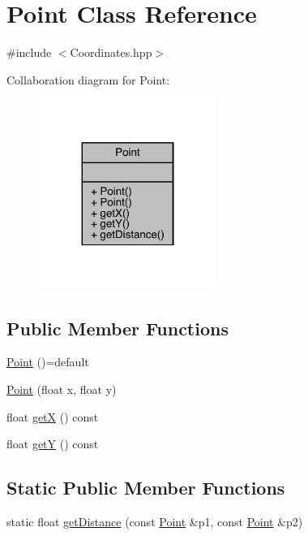 \hypertarget{class_point}{}\section{Point Class Reference}
\label{class_point}


{\ttfamily \#include $<$Coordinates.\+hpp$>$}



Collaboration diagram for Point\+:\nopagebreak
\begin{figure}[H]
\begin{center}
\leavevmode
\includegraphics[width=164pt]{class_point__coll__graph}
\end{center}
\end{figure}
\subsection*{Public Member Functions}
\begin{DoxyCompactItemize}
\item 
\hyperlink{class_point_a257415ad611a16bb73628efcdb87d0fd}{Point} ()=default
\item 
\hyperlink{class_point_a30bc8409287de4f43e160664be834636}{Point} (float x, float y)
\item 
float \hyperlink{class_point_a29c44ec7c7279e02629645a06cdaf7d5}{getX} () const
\item 
float \hyperlink{class_point_a2371ffadbe245d12a8f556d0a976521b}{getY} () const
\end{DoxyCompactItemize}
\subsection*{Static Public Member Functions}
\begin{DoxyCompactItemize}
\item 
static float \hyperlink{class_point_a1dbe2026f242cd96843ea14a67e8a2c3}{get\+Distance} (const \hyperlink{class_point}{Point} \&p1, const \hyperlink{class_point}{Point} \&p2)
\end{DoxyCompactItemize}


